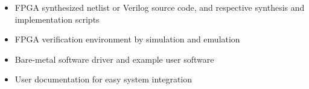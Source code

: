\begin{itemize}
  \itemsep-0.5em
\item FPGA synthesized netlist or Verilog source code, and respective
  synthesis and implementation scripts
\item FPGA verification environment by simulation and emulation
\item Bare-metal software driver and example user software
\item User documentation for easy system integration
\end{itemize}
